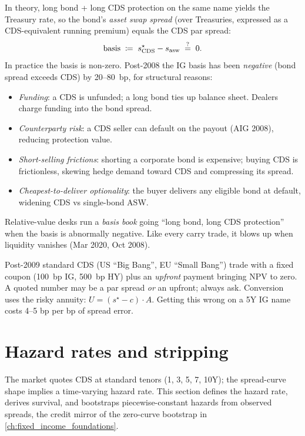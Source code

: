 In theory, long bond + long CDS protection on the same name yields
the Treasury rate, so the bond's \emph{asset swap spread} (over
Treasuries, expressed as a CDS-equivalent running premium) equals
the CDS par spread:
\[
  \mathrm{basis} \;\coloneqq\; s^\star_{\mathrm{CDS}} - s_{\mathrm{asw}}
  \;\stackrel{?}{=}\; 0.
\]
In practice the basis is non-zero.  Post-2008 the IG basis has been
\emph{negative} (bond spread exceeds CDS) by 20--80~bp, for
structural reasons:
\begin{itemize}
  \item \emph{Funding}: a CDS is unfunded; a long bond ties up
    balance sheet.  Dealers charge funding into the bond spread.
  \item \emph{Counterparty risk}: a CDS seller can default on the
    payout (AIG 2008), reducing protection value.
  \item \emph{Short-selling frictions}: shorting a corporate bond
    is expensive; buying CDS is frictionless, skewing hedge demand
    toward CDS and compressing its spread.
  \item \emph{Cheapest-to-deliver optionality}: the buyer delivers
    any eligible bond at default, widening CDS vs single-bond ASW.
\end{itemize}
Relative-value desks run a \emph{basis book} going ``long bond,
long CDS protection'' when the basis is abnormally negative.  Like
every carry trade, it blows up when liquidity vanishes (Mar 2020,
Oct 2008).

\begin{pitfallbox}
Post-2009 standard CDS (US ``Big Bang'', EU ``Small Bang'') trade
with a fixed coupon (100~bp IG, 500~bp HY) plus an \emph{upfront}
payment bringing NPV to zero.  A quoted number may be a par spread
\emph{or} an upfront; always ask.  Conversion uses the risky
annuity: $U = (s^\star - c) \cdot A$.  Getting this wrong on a
5Y IG name costs 4--5 bp per bp of spread error.
\end{pitfallbox}


\section{Hazard rates and stripping}
\label{sec:hazard_stripping}

The market quotes CDS at standard tenors (1, 3, 5, 7, 10Y); the
spread-curve shape implies a time-varying hazard rate.  This section
defines the hazard rate, derives survival, and bootstraps
piecewise-constant hazards from observed spreads, the credit
mirror of the zero-curve bootstrap in
\cref{ch:fixed_income_foundations}.

